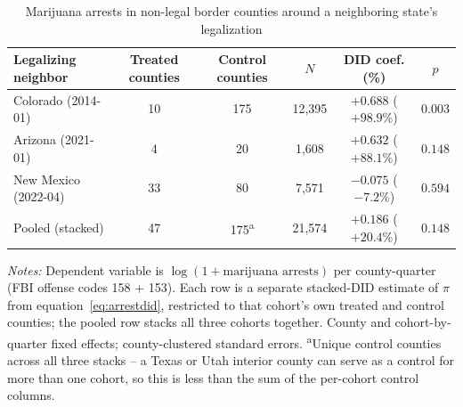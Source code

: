 \begin{table}[htbp]
\centering
\caption{Marijuana arrests in non-legal border counties around a neighboring state's legalization}
\label{tab:arrestdid}
\footnotesize
\begin{tabular}{lccccc}
\toprule
Legalizing neighbor & Treated counties & Control counties & $N$ & DID coef. (\%) & $p$ \\
\midrule
Colorado (2014-01) & 10 & 175 & 12,395 & $+0.688$ ($+98.9\%$) & $0.003$ \\
Arizona (2021-01)  & 4  & 20  & 1,608  & $+0.632$ ($+88.1\%$) & $0.148$ \\
New Mexico (2022-04) & 33 & 80 & 7,571  & $-0.075$ ($-7.2\%$)  & $0.594$ \\
\midrule
Pooled (stacked) & 47 & 175\textsuperscript{a} & 21,574 & $+0.186$ ($+20.4\%$) & $0.148$ \\
\bottomrule
\end{tabular}
\begin{minipage}{0.98\textwidth}
\vspace{0.3em}
\footnotesize
\textit{Notes:} Dependent variable is $\log(1+\text{marijuana arrests})$ per county-quarter (FBI offense
codes 158 + 153). Each row is a separate stacked-DID estimate of $\pi$ from equation~\ref{eq:arrestdid},
restricted to that cohort's own treated and control counties; the pooled row stacks all three cohorts
together. County and cohort-by-quarter fixed effects; county-clustered standard errors.
\textsuperscript{a}Unique control counties across all three stacks -- a Texas or Utah interior county can
serve as a control for more than one cohort, so this is less than the sum of the per-cohort control columns.
\end{minipage}
\end{table}
